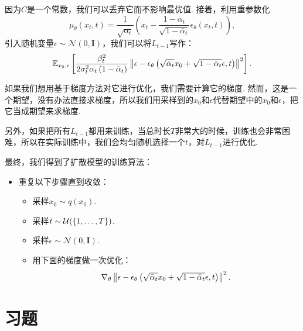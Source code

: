 因为$C$是一个常数，我们可以丢弃它而不影响最优值. 接着，利用重参数化
\[
\mu_{\theta}(x_t, t) =  \frac{1}{\sqrt{\alpha_t}} \left( x_t - \frac{1-\alpha_t}{\sqrt{1 - \bar{\alpha}_t}}\epsilon_{\theta}(x_t, t) \right),
\]
引入随机变量$\epsilon\sim\mathcal{N}(0,\mathbf{I})$，我们可以将$L_{t-1}$写作：
\[
\mathbb{E}_{x_0, \epsilon}\left[\frac{\beta_t^2}{2 \sigma_t^2 \alpha_t\left(1-\bar{\alpha}_t\right)}\left\|\epsilon-\epsilon_\theta\left(\sqrt{\bar{\alpha}_t} x_0+\sqrt{1-\bar{\alpha}_t} \epsilon, t\right)\right\|^2\right].
\]

如果我们想用基于梯度方法对它进行优化，我们需要计算它的梯度. 然而，这是一个期望，没有办法直接求梯度，所以我们用采样到的$x_0$和$\epsilon$代替期望中的$x_0$和$\epsilon$，把它当成期望来求梯度. 

另外，如果把所有$L_{t-1}$都用来训练，当总时长$T$非常大的时候，训练也会非常困难，所以在实际训练中，我们会均匀随机选择一个$t$，对$L_{t-1}$进行优化. 

最终，我们得到了扩散模型的训练算法：

\begin{itemize}
    \item 重复以下步骤直到收敛：
    \begin{itemize}
        \item 采样$x_0 \sim q\left(x_0\right)$.
        \item 采样$t \sim \mathcal{U}(\{1, \ldots, T\})$.
        \item 采样$\epsilon \sim \mathcal{N}(0, \mathbf{I})$.
        \item 用下面的梯度做一次优化：
        \[
        \nabla_\theta\left\|\epsilon-\epsilon_\theta\left(\sqrt{\bar{\alpha}_t} x_0+\sqrt{1-\bar{\alpha}_t} \epsilon, t\right)\right\|^2.
        \]
    \end{itemize}
\end{itemize}

\section{习题}

